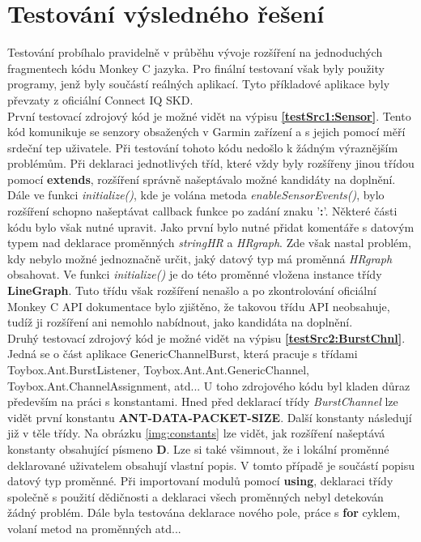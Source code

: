 \chapter{Testování výsledného řešení}
Testování probíhalo pravidelně v průběhu vývoje rozšíření na jednoduchých fragmentech kódu Monkey C jazyka. Pro finální testovaní však byly použity programy, jenž byly součástí reálných aplikací. Tyto příkladové aplikace byly převzaty z oficiální Connect IQ SKD.\\

První testovací zdrojový kód je možné vidět na výpisu \textbf{\ref{testSrc1:Sensor}}. Tento kód komunikuje se senzory obsažených v Garmin zařízení a s jejich pomocí měří srdeční tep uživatele. Při testování tohoto kódu nedošlo k žádným výraznějším problémům. Při deklaraci jednotlivých tříd, které vždy byly rozšířeny jinou třídou pomocí \textbf{extends}, rozšíření správně našeptávalo možné kandidáty na doplnění. Dále ve funkci \textit{initialize()}, kde je volána metoda \textit{enableSensorEvents()}, bylo rozšíření schopno našeptávat callback funkce po zadání znaku '\textbf{:}'. Některé části kódu bylo však nutné upravit. Jako první bylo nutné přidat komentáře s datovým typem nad deklarace proměnných\textit{ stringHR} a \textit{HRgraph}. Zde však nastal problém, kdy nebylo možné jednoznačně určit, jaký datový typ má proměnná \textit{HRgraph} obsahovat. Ve funkci \textit{initialize()} je do této proměnné vložena instance třídy \textbf{LineGraph}. Tuto třídu však rozšíření nenašlo a po zkontrolování oficiální Monkey C API \cite{api_docs} dokumentace bylo zjištěno, že takovou třídu API neobsahuje, tudíž ji rozšíření ani nemohlo nabídnout, jako kandidáta na doplnění.
\\
Druhý testovací zdrojový kód je možné vidět na výpisu \textbf{\ref{testSrc2:BurstChnl}}. Jedná se o část aplikace GenericChannelBurst, která pracuje s třídami Toybox.Ant.BurstListener, Toybox.Ant.Ant.GenericChannel,  Toybox.Ant.ChannelAssignment, atd... U toho zdrojového kódu byl kladen důraz především na práci s konstantami. Hned před deklarací třídy \textit{BurstChannel} lze vidět první konstantu \textbf{ANT-DATA-PACKET-SIZE}. Další konstanty následují již v těle třídy. Na obrázku \ref{img:constants} lze vidět, jak rozšíření našeptává konstanty obsahující písmeno \textbf{D}. Lze si také všimnout, že i lokální proměnné deklarované uživatelem obsahují vlastní popis. V tomto případě je součástí popisu datový typ proměnné. Při importovaní modulů pomocí \textbf{using}, deklaraci třídy společně s použití dědičnosti a deklaraci všech proměnných nebyl detekován žádný problém. Dále byla testována deklarace nového pole, práce s \textbf{for} cyklem, volaní metod na proměnných atd... 

